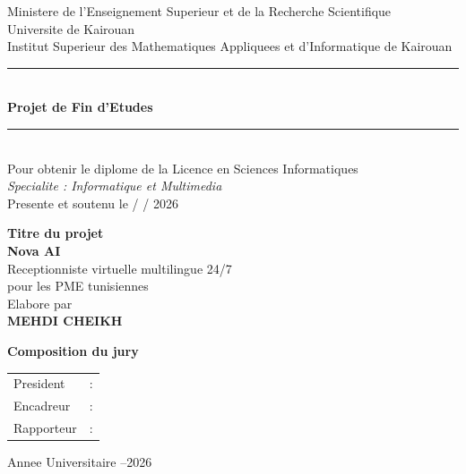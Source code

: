\begin{titlepage}
\thispagestyle{empty}
\begin{center}

{\large Ministere de l'Enseignement Superieur et de la Recherche Scientifique}\\[4pt]
{\large Universite de Kairouan}\\[4pt]
{\large Institut Superieur des Mathematiques Appliquees et d'Informatique de Kairouan}\\[20pt]


\vspace{20pt}
\rule{0.85\textwidth}{1.5pt}\\[6pt]
{\Huge\bfseries Projet de Fin d'Etudes}\\[6pt]
\rule{0.85\textwidth}{1.5pt}\\[10pt]

{\large Pour obtenir le diplome de la Licence en Sciences Informatiques}\\[4pt]
{\large \textit{Specialite : Informatique et Multimedia}}\\[20pt]

{\large Presente et soutenu le \dotfill / \dotfill / 2026}

\vspace{30pt}
\textbf{\large Titre du projet}\\[6pt]
{\Huge\bfseries Nova AI}\\[6pt]
{\Large Receptionniste virtuelle multilingue 24/7}\\[2pt]
{\Large pour les PME tunisiennes}\\[20pt]

{\large Elabore par}\\[4pt]
\textbf{\Large MEHDI CHEIKH}

\vfill

\textbf{Composition du jury}\\[8pt]
\begin{tabular}{ll}
President & : \dotfill \\
Encadreur & : \dotfill \\
Rapporteur & : \dotfill \\
\end{tabular}

\vspace{20pt}
{\large Annee Universitaire --2026}
\end{center}
\end{titlepage}
